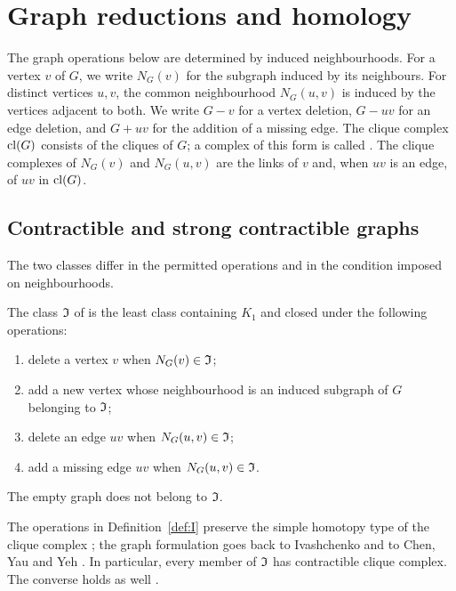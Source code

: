\section{Graph reductions and homology}\label{sec:prelim}

The graph operations below are determined by induced neighbourhoods.
For a vertex $v$ of $G$, we write $N_G(v)$ for the subgraph induced by
its neighbours. For distinct vertices $u,v$, the common neighbourhood
$N_G(u,v)$ is induced by the vertices adjacent to both. We write $G-v$
for a vertex deletion, $G-uv$ for an edge deletion, and $G+uv$ for the
addition of a missing edge. The clique complex $\operatorname{cl}(G)$ consists of the
cliques of $G$; a complex of this form is called .
The clique complexes of $N_G(v)$ and $N_G(u,v)$ are the links of $v$
and, when $uv$ is an edge, of $uv$ in $\operatorname{cl}(G)$.

\subsection{Contractible and strong contractible graphs}
\label{sec:contractible}
The two classes differ in the permitted operations and in the
condition imposed on neighbourhoods.

\begin{definition}\label{def:I}
The class $\mathfrak I$ of  is the least class
containing $K_1$ and closed under the following operations:
\begin{enumerate}[label=(\roman*),leftmargin=2.5em]
\item delete a vertex $v$ when $N_G(v)\in\mathfrak I$;
\item add a new vertex whose neighbourhood is an induced subgraph
of $G$ belonging to $\mathfrak I$;
\item delete an edge $uv$ when $N_G(u,v)\in\mathfrak I$;
\item add a missing edge $uv$ when $N_G(u,v)\in\mathfrak I$.
\end{enumerate}
The empty graph does not belong to $\mathfrak I$.
\end{definition}

The operations in Definition~\ref{def:I} preserve the simple homotopy
type of the clique complex \cite[Theorem~2.8]{DochtermannMatsushita2025};
the graph formulation goes back to Ivashchenko and to Chen, Yau and Yeh
\cite{Ivashchenko1994a,ChenYauYeh2001}. In particular, every member
of $\mathfrak I$ has contractible clique complex. The converse holds as well
\cite[Corollary~1.5]{DochtermannMatsushita2025}.


